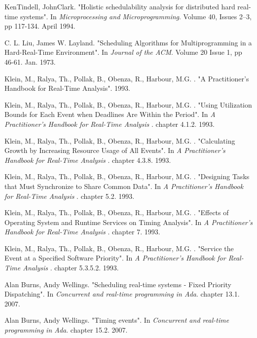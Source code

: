 \documentclass{article}
\begin{document}
\begin{thebibliography}{1}
KenTindell, JohnClark.
\newblock "Holistic schedulability analysis for distributed hard real-time systems".
\newblock In {\em Microprocessing and Microprogramming}. Volume 40, Issues 2–3, pp 117-134. April 1994.

C. L. Liu, James W. Layland.
\newblock "Scheduling Algorithms for Multiprogramming in a Hard-Real-Time Environment".
\newblock In {\em Journal of the ACM}. Volume 20 Issue 1, pp 46-61. Jan. 1973.

Klein, M., Ralya, Th., Pollak, B., Obenza, R., Harbour, M.G. .
\newblock "A Practitioner's Handbook for Real-Time Analysis". 1993.

Klein, M., Ralya, Th., Pollak, B., Obenza, R., Harbour, M.G. .
\newblock "Using Utilization Bounds for Each Event when Deadlines Are Within the Period".
\newblock In {\em A Practitioner's Handbook for Real-Time Analysis
}. chapter 4.1.2. 1993.

Klein, M., Ralya, Th., Pollak, B., Obenza, R., Harbour, M.G. .
\newblock "Calculating Growth by Increasing Resource Usage of All Events".
\newblock In {\em A Practitioner's Handbook for Real-Time Analysis
}. chapter 4.3.8. 1993.

Klein, M., Ralya, Th., Pollak, B., Obenza, R., Harbour, M.G. .
\newblock "Designing Tasks that Must Synchronize to Share Common Data".
\newblock In {\em A Practitioner's Handbook for Real-Time Analysis
}. chapter 5.2. 1993.

Klein, M., Ralya, Th., Pollak, B., Obenza, R., Harbour, M.G. .
\newblock "Effects of Operating System and Runtime Services on Timing Analysis".
\newblock In {\em A Practitioner's Handbook for Real-Time Analysis
}. chapter 7. 1993.

Klein, M., Ralya, Th., Pollak, B., Obenza, R., Harbour, M.G. .
\newblock "Service the Event at a Specified Software Priority".
\newblock In {\em A Practitioner's Handbook for Real-Time Analysis
}. chapter 5.3.5.2. 1993.

Alan Burns, Andy Wellings.
\newblock "Scheduling real-time systems - Fixed Priority Dispatching".
\newblock In {\em Concurrent and real-time programming in Ada}. chapter 13.1. 2007.

Alan Burns, Andy Wellings.
\newblock "Timing events".
\newblock In {\em Concurrent and real-time programming in Ada}. chapter 15.2. 2007.


\end{thebibliography}
\end{document}
